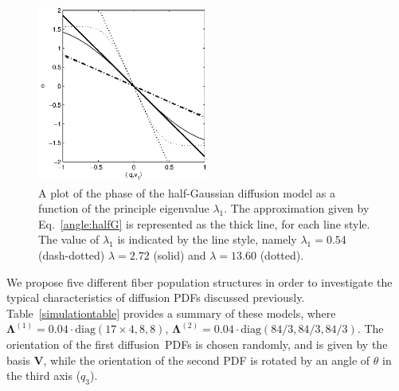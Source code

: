 \documentclass[authoryear,preprint,12pt]{elsarticle}
\newcommand{\q}{\mathbf{q}}
\newcommand{\bsL}{\bs{\Lambda}}
\newcommand{\bld}[1]{\mathbf{#1}}
\newcommand{\bs}[1]{\boldsymbol{#1}}
\begin{document}
\begin{figure}[!htbp]
  \begin{center}
    \includegraphics[width=0.5\textwidth]{phase1.eps}
  \end{center}
  \caption{A plot of the phase of the half-Gaussian diffusion model as
    a function of the principle eigenvalue $\lambda_1$.  The
    approximation given by Eq.~\eqref{angle:halfG} is represented as
    the thick line, for each line style.  The value of $\lambda_1$ is
    indicated by the line style, namely $\lambda_1=0.54$ (dash-dotted)
    $\lambda=2.72$ (solid) and $\lambda=13.60$ (dotted).}
  \label{phaseplot}
\end{figure}

We propose five different fiber population structures in order to
investigate the typical characteristics of diffusion PDFs discussed
previously.  Table~\ref{simulationtable} provides a summary of these
models, where $\bsL^{(1)}=0.04\cdot{\text{diag}}(17\times4,8,8)$,
$\bsL^{(2)}=0.04\cdot{\text{diag}}(84/3,84/3,84/3)$.  The orientation
of the first diffusion~PDFs is chosen randomly, and is given by the
basis $\bld{V}$, while the orientation of the second PDF is rotated by
an angle of $\theta$ in the third axis ($q_3$).
\end{document}
